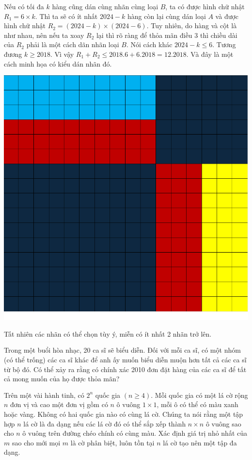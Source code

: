 \documentclass[11pt]{scrartcl}
\begin{document}
\begin{itemize}[label=, leftmargin=0em, itemsep=0.5em]
\begin{sol}
        Nếu có tối đa $k$ hàng cũng dán cùng nhãn cùng loại $B$, ta có được hình chữ nhật $R_1 = 6\times k$. Thì ta sẽ có ít nhất $2024 - k$ hàng còn lại cùng dán loại $A$ và được hình chữ nhật $R_2 = (2024-k)\times(2024-6)$. Tuy nhiên, do hàng và cột là như nhau, nên nếu ta xoay $R_2$ lại thì rõ ràng để thỏa mãn điều 3 thì chiều dài của $R_2$ phải là một cách dãn nhãn loại $B$. Nói cách khác $2024 - k \leq 6$. Tương đương $k \geq 2018$. Vì vậy $R_1 + R_2 \leq 2018.6 + 6.2018 = 12.2018$. Và đây là một cách minh họa có kiểu dán nhãn đó.
        \begin{center}
            \includegraphics[scale=0.3]{Image/tst.pdf}
        \end{center}
        Tất nhiên các nhãn có thể chọn tùy ý, miễn có ít nhất 2 nhãn trở lên.
    \end{sol}
    \begin{btvn}
        Trong một buổi hòa nhạc, 20 ca sĩ sẽ biểu diễn. Đối với mỗi ca sĩ, có một nhóm (có thể trống) các ca sĩ khác để anh ấy muốn biểu diễn muộn hơn tất cả các ca sĩ từ bộ đó. Có thể xảy ra rằng có chính xác 2010 đơn đặt hàng của các ca sĩ để tất cả mong muốn của họ được thỏa mãn?
    \end{btvn}
    \begin{btvn}
        Trên một vài hành tinh, có $2^n$ quốc gia $(n \geq 4)$. Mỗi quốc gia có một lá cờ rộng $n$ đơn vị và cao một đơn vị gồm có $n$ ô vuông $1\times 1$, mỗi ô có thể có màu xanh hoặc vàng. Không có hai quốc gia nào có cùng lá cờ. Chúng ta nói rằng một tập hợp $n$ lá cờ là đa dạng nếu các lá cờ đó có thể sắp xếp thành $n \times n$ ô vuông sao cho $n$ ô vuông trên đường chéo chính có cùng màu. Xác định giá trị nhỏ nhất của $m$ sao cho mới mọi $m$ là cờ phân biệt, luôn tồn tại $n$ lá cờ tạo nên một tập đa dạng.

\end{btvn}
\end{itemize}
\end{document}
